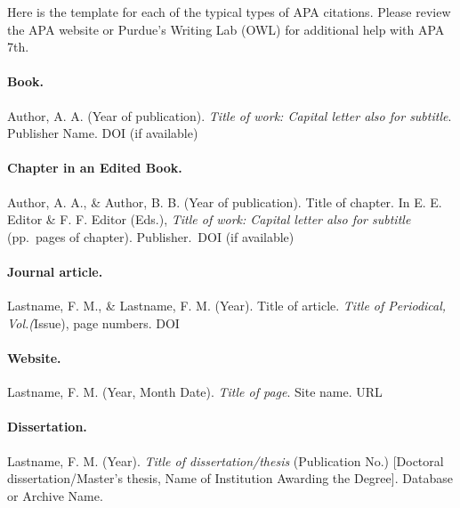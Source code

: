 \documentclass[
  b5paper]{book}
\begin{document}
Here is the template for each of the typical types of APA citations. Please review the APA website or Purdue's Writing Lab (OWL) for additional help with APA 7th.

\hypertarget{book.}{%
\paragraph*{Book.}\label{book.}}

Author, A. A. (Year of publication). \emph{Title of work: Capital letter also for subtitle}. Publisher Name. DOI (if available)

\hypertarget{chapter-in-an-edited-book.}{%
\paragraph*{Chapter in an Edited Book.}\label{chapter-in-an-edited-book.}}

Author, A. A., \& Author, B. B. (Year of publication). Title of chapter. In E. E. Editor \& F. F. Editor (Eds.), \emph{Title of work: Capital letter also for subtitle} (pp.~pages of chapter). Publisher.~DOI (if available)

\hypertarget{journal-article.}{%
\paragraph*{Journal article.}\label{journal-article.}}

Lastname, F. M., \& Lastname, F. M. (Year). Title of article. \emph{Title of Periodical, Vol.(}Issue), page numbers. DOI

\hypertarget{website.}{%
\paragraph*{Website.}\label{website.}}

Lastname, F. M. (Year, Month Date). \emph{Title of page}. Site name. URL

\hypertarget{dissertation.}{%
\paragraph*{Dissertation.}\label{dissertation.}}

Lastname, F. M. (Year). \emph{Title of dissertation/thesis} (Publication No.) {[}Doctoral dissertation/Master's thesis, Name of Institution Awarding the Degree{]}. Database or Archive Name.
\end{document}
